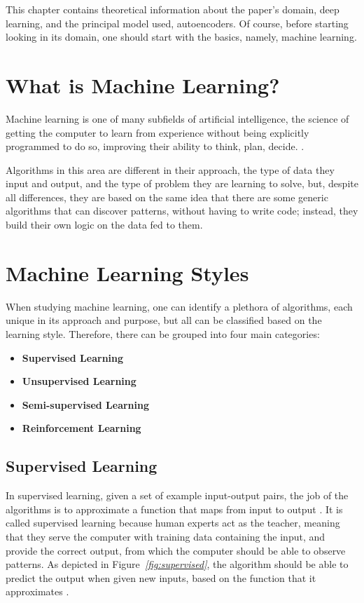 This chapter contains theoretical information about the paper's domain,
deep learning, and the principal model used, autoencoders.
Of course, before starting looking in its domain,
one should start with the basics, namely, machine learning.

\section{What is Machine Learning?}

Machine learning is one of many subfields of artificial intelligence,
the science of getting the computer to learn from experience
without being explicitly programmed to do so, improving their ability to think, plan, decide. \cite{whatIsML}.

Algorithms in this area are different in their approach,
the type of data they input and output,
and the type of problem they are learning to
solve, but,
despite all differences,
they are based on the same idea that there are some generic algorithms
that can discover patterns, without having to write code; instead,
they build their own logic on the data fed to them.

\section{Machine Learning Styles}
When studying machine learning, one can identify a plethora of algorithms,
each unique in its approach and purpose, but all can be classified
based on the learning style. Therefore, there can be grouped into four main categories:
\begin{itemize}
  \item \textbf{Supervised Learning}
  \item \textbf{Unsupervised Learning}
  \item \textbf{Semi-supervised Learning}
  \item \textbf{Reinforcement Learning}
\end{itemize}
\vspace{0.5cm}

\subsection{Supervised Learning}
In supervised learning, given a set of example input-output pairs,
the job of the algorithms is to approximate a function that maps from input to output \cite{amai}.
It is called supervised learning because human experts act as the teacher,
meaning that they serve the computer with training data containing the input, and
provide the correct output, from which the computer should be able to observe patterns.
As depicted in Figure\emph{~\ref{fig:supervised}},
the algorithm should be able to predict the output when given new inputs,
based on the function that it approximates \cite{typesMLMedium}.

